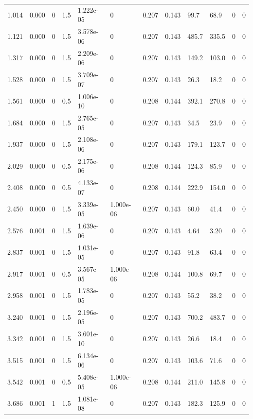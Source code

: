 \documentclass[preview]{standalone}
\begin{document}
{{\begin{tabular}{L{1.2cm}C{1.2cm} C{0.3cm}C{0.5cm} C{1.4cm}C{1.4cm} C{1.4cm}C{1.4cm} C{1.6cm}C{1.6cm} C{1.6cm}C{1.6cm}}
  1.014  &  0.000  & 0     & 1.5 &  1.222e-05  & 0  &  0.207&   0.143& 99.7 & 68.9   &  0 & 0  \\ 
  1.121  &  0.000  & 0     & 1.5 &  3.578e-06  & 0  &  0.207&   0.143& 485.7 & 335.5   &  0 & 0  \\ 
  1.317  &  0.000  & 0     & 1.5 &  2.209e-06  & 0  &  0.207&   0.143& 149.2 & 103.0   &  0 & 0  \\ 
  1.528  &  0.000  & 0     & 1.5 &  3.709e-07  & 0  &  0.207&   0.143& 26.3 & 18.2   &  0 & 0  \\ 
  1.561  &  0.000  & 0     & 0.5 &  1.006e-10  & 0  &  0.208&   0.144& 392.1 & 270.8   &  0 & 0  \\ 
  1.684  &  0.000  & 0     & 1.5 &  2.765e-05  & 0  &  0.207&   0.143& 34.5 & 23.9   &  0 & 0  \\ 
  1.937  &  0.000  & 0     & 1.5 &  2.108e-06  & 0  &  0.207&   0.143& 179.1 & 123.7   &  0 & 0  \\ 
  2.029  &  0.000  & 0     & 0.5 &  2.175e-06  & 0  &  0.208&   0.144& 124.3 & 85.9   &  0 & 0  \\ 
  2.408  &  0.000  & 0     & 0.5 &  4.133e-07  & 0  &  0.208&   0.144& 222.9 & 154.0   &  0 & 0  \\ 
  2.450  &  0.000  & 0     & 1.5 &  3.339e-05  & 1.000e-06  &  0.207&   0.143& 60.0 & 41.4   &  0 & 0  \\ 
  2.576  &  0.001  & 0     & 1.5 &  1.639e-06  & 0  &  0.207&   0.143& 4.64 & 3.20   &  0 & 0  \\ 
  2.837  &  0.001  & 0     & 1.5 &  1.031e-05  & 0  &  0.207&   0.143& 91.8 & 63.4   &  0 & 0  \\ 
  2.917  &  0.001  & 0     & 0.5 &  3.567e-05  & 1.000e-06  &  0.208&   0.144& 100.8 & 69.7   &  0 & 0  \\ 
  2.958  &  0.001  & 0     & 1.5 &  1.783e-05  & 0  &  0.207&   0.143& 55.2 & 38.2   &  0 & 0  \\ 
  3.240  &  0.001  & 0     & 1.5 &  2.196e-05  & 0  &  0.207&   0.143& 700.2 & 483.7   &  0 & 0  \\ 
  3.342  &  0.001  & 0     & 1.5 &  3.601e-10  & 0  &  0.207&   0.143& 26.6 & 18.4   &  0 & 0  \\ 
  3.515  &  0.001  & 0     & 1.5 &  6.134e-06  & 0  &  0.207&   0.143& 103.6 & 71.6   &  0 & 0  \\ 
  3.542  &  0.001  & 0     & 0.5 &  5.408e-05  & 1.000e-06  &  0.208&   0.144& 211.0 & 145.8   &  0 & 0  \\ 
  3.686  &  0.001  & 1     & 1.5 &  1.081e-08  & 0  &  0.207&   0.143& 182.3 & 125.9   &  0 & 0  \\ 

\end{tabular}}}
\end{document}
